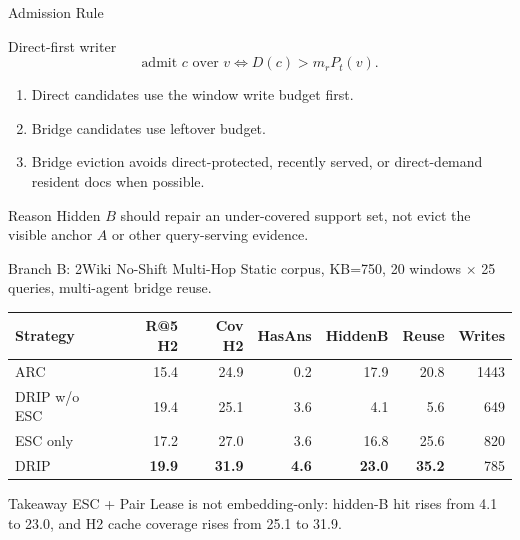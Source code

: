 \documentclass[aspectratio=169,10pt]{beamer}
\begin{document}
\begin{frame}{Admission Rule}
  \begin{block}{Direct-first writer}
    \[
      \text{admit } c \text{ over } v
      \Longleftrightarrow
      D(c) > m_r P_t(v).
    \]
  \end{block}

  \begin{enumerate}
    \item Direct candidates use the window write budget first.
    \item Bridge candidates use leftover budget.
    \item Bridge eviction avoids direct-protected, recently served, or direct-demand resident docs when possible.
  \end{enumerate}

  \begin{alertblock}{Reason}
    Hidden $B$ should repair an under-covered support set, not evict the visible
    anchor $A$ or other query-serving evidence.
  \end{alertblock}
\end{frame}

\begin{frame}{Branch B: 2Wiki No-Shift Multi-Hop}
  \small
  Static corpus, KB=750, 20 windows $\times$ 25 queries, multi-agent bridge reuse.

  \begin{table}
  \centering
  \begin{tabular}{lrrrrrr}
    \toprule
    Strategy & R@5 H2 & Cov H2 & HasAns & HiddenB & Reuse & Writes \\
    \midrule
    ARC & 15.4 & 24.9 & 0.2 & 17.9 & 20.8 & 1443 \\
    DRIP w/o ESC & 19.4 & 25.1 & 3.6 & 4.1 & 5.6 & 649 \\
    ESC only & 17.2 & 27.0 & 3.6 & 16.8 & 25.6 & 820 \\
    DRIP & \textbf{19.9} & \textbf{31.9} & \textbf{4.6} & \textbf{23.0} & \textbf{35.2} & 785 \\
    \bottomrule
  \end{tabular}
  \end{table}

  \begin{block}{Takeaway}
    ESC + Pair Lease is not embedding-only: hidden-B hit rises from 4.1 to 23.0,
    and H2 cache coverage rises from 25.1 to 31.9.
  \end{block}
\end{frame}
\end{document}
